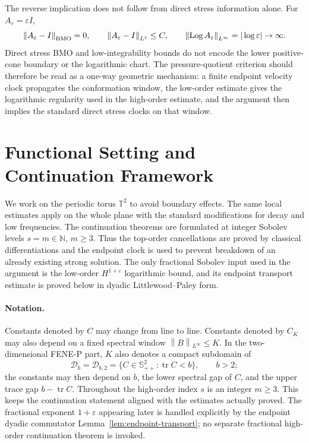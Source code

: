 \documentclass[11pt]{article}
\newcommand{\T}{\mathbb T}
\newcommand{\Spp}{\mathbb S_{++}}
\newcommand{\tr}{\operatorname{tr}}
\newcommand{\Log}{\operatorname{Log}}
\newcommand{\calD}{\mathcal D}
\newcommand{\eps}{\varepsilon}
\newcommand{\norm}[1]{\left\lVert #1\right\rVert}
\begin{document}
The reverse implication does not follow from direct stress information alone.
For \(A_\varepsilon=\varepsilon I\),
\[
  \norm{A_\varepsilon-I}_{{\rm BMO}}=0,
  \qquad
  \norm{A_\varepsilon-I}_{L^1}\le C,
  \qquad
  \norm{\Log A_\varepsilon}_{L^\infty}=|\log\varepsilon|\to\infty .
\]
Direct stress BMO and low-integrability bounds do not encode the lower
positive-cone boundary or the logarithmic chart.  The pressure-quotient
criterion should therefore be read as a one-way geometric mechanism: a finite
endpoint velocity clock propagates the conformation window, the low-order estimate gives the logarithmic regularity used in the high-order estimate, and
the argument then implies the
standard direct stress clocks on that window.

\section{Functional Setting and Continuation Framework}
\label{sec:functional}

We work on the periodic torus \(\T^2\) to avoid boundary effects.  The same
local estimates apply on the whole plane with the standard modifications for
decay and low frequencies.  The continuation theorems are formulated at
integer Sobolev levels \(s=m\in\mathbb N\), \(m\ge3\).  Thus the top-order
cancellations are proved by classical differentiations and the endpoint clock is
used to prevent breakdown of an already existing strong solution.  The only fractional
Sobolev input used in the argument is the low-order
\(H^{1+\eps}\) logarithmic bound, and its endpoint transport estimate is
proved below in dyadic Littlewood--Paley form.

\paragraph{Notation.}
Constants denoted by \(C\) may change from line to line.  Constants denoted by
\(C_K\) may also depend on a fixed spectral window
\(\norm{B}_{L^\infty}\le K\).  In the two-dimensional FENE-P part, \(K\) also
denotes a compact subdomain of
\[
  \calD_b=\calD_{b,2}=\{C\in\Spp^2:\tr C<b\},\qquad b>2;
\]
the constants may then depend on \(b\), the lower spectral gap of \(C\), and
the upper trace gap \(b-\tr C\).  Throughout the high-order index \(s\) is an integer \(m\ge3\).  This
keeps the continuation statement aligned with the estimates actually proved.
The fractional exponent \(1+\eps\) appearing later is handled explicitly by
the endpoint dyadic commutator Lemma~\ref{lem:endpoint-transport}; no separate
fractional high-order continuation theorem is invoked.
\end{document}
